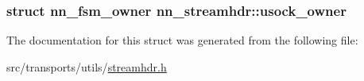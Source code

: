 \subsubsection[{usock\+\_\+owner}]{\setlength{\rightskip}{0pt plus 5cm}struct {\bf nn\+\_\+fsm\+\_\+owner} nn\+\_\+streamhdr\+::usock\+\_\+owner}\hypertarget{structnn__streamhdr_a7ff476fc37646a9c472dbc44006849a3}{}\label{structnn__streamhdr_a7ff476fc37646a9c472dbc44006849a3}


The documentation for this struct was generated from the following file\+:\begin{DoxyCompactItemize}
\item 
src/transports/utils/\hyperlink{streamhdr_8h}{streamhdr.\+h}\end{DoxyCompactItemize}
